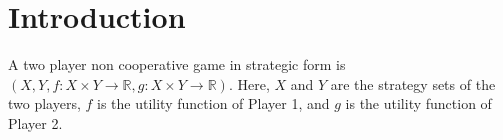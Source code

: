 \section{Introduction}

\begin{definition}
    A two player non cooperative game in strategic form is $(X,Y,f:X\times Y\rightarrow\mathbb{R},g:X\times Y\rightarrow\mathbb{R})$. 
    Here, $X$ and $Y$ are the strategy sets of the two players, $f$ is the utility function of Player 1, and $g$ is the utility function of Player 2. 
\end{definition}